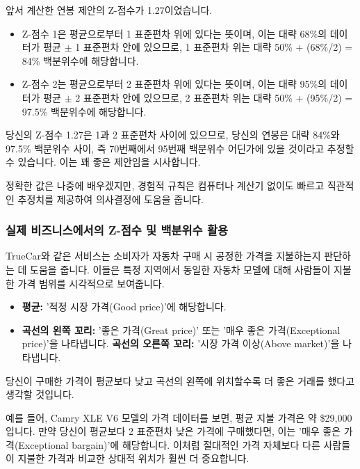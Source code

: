 \documentclass[11pt,a4paper]{book}
\theoremstyle{definition}
\begin{document}
\begin{examplebox}[title=경험적 규칙 적용: Z-점수 1.27]
앞서 계산한 연봉 제안의 Z-점수가 1.27이었습니다.
\begin{itemize}
    \item Z-점수 1은 평균으로부터 1 표준편차 위에 있다는 뜻이며, 이는 대략 68\%의 데이터가 평균 \(\pm\) 1 표준편차 안에 있으므로, 1 표준편차 위는 대략 50\% + (68\%/2) = 84\% 백분위수에 해당합니다.
    \item Z-점수 2는 평균으로부터 2 표준편차 위에 있다는 뜻이며, 이는 대략 95\%의 데이터가 평균 \(\pm\) 2 표준편차 안에 있으므로, 2 표준편차 위는 대략 50\% + (95\%/2) = 97.5\% 백분위수에 해당합니다.
\end{itemize}
당신의 Z-점수 1.27은 1과 2 표준편차 사이에 있으므로, 당신의 연봉은 대략 84\%와 97.5\% 백분위수 사이, 즉 70번째에서 95번째 백분위수 어딘가에 있을 것이라고 추정할 수 있습니다. 이는 꽤 좋은 제안임을 시사합니다.

정확한 값은 나중에 배우겠지만, 경험적 규칙은 컴퓨터나 계산기 없이도 빠르고 직관적인 추정치를 제공하여 의사결정에 도움을 줍니다.
\end{examplebox}

\subsubsection*{실제 비즈니스에서의 Z-점수 및 백분위수 활용}

\begin{examplebox}[title=자동차 가격 비교 (TrueCar)]
TrueCar와 같은 서비스는 소비자가 자동차 구매 시 공정한 가격을 지불하는지 판단하는 데 도움을 줍니다. 이들은 특정 지역에서 동일한 자동차 모델에 대해 사람들이 지불한 가격 범위를 시각적으로 보여줍니다.
\begin{itemize}
    \item \textbf{평균:} '적정 시장 가격(Good price)'에 해당합니다.
    \item \textbf{곡선의 왼쪽 꼬리:} '좋은 가격(Great price)' 또는 '매우 좋은 가격(Exceptional price)'을 나타냅니다.
    \textbf{곡선의 오른쪽 꼬리:} '시장 가격 이상(Above market)'을 나타냅니다.
\end{itemize}
당신이 구매한 가격이 평균보다 낮고 곡선의 왼쪽에 위치할수록 더 좋은 거래를 했다고 생각할 것입니다.

예를 들어, Camry XLE V6 모델의 가격 데이터를 보면, 평균 지불 가격은 약 \$29,000입니다. 만약 당신이 평균보다 2 표준편차 낮은 가격에 구매했다면, 이는 '매우 좋은 가격(Exceptional bargain)'에 해당합니다. 이처럼 절대적인 가격 자체보다 다른 사람들이 지불한 가격과 비교한 상대적 위치가 훨씬 더 중요합니다.
\end{examplebox}
\end{document}
